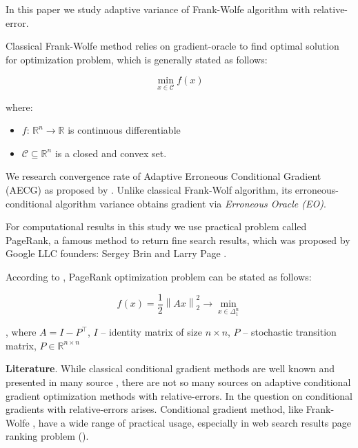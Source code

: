 \documentclass[runningheads, final]{llncs}
\newcommand{\norm}[1]{\left\lVert#1\right\rVert}
\begin{document}
In this paper we study adaptive variance of Frank-Wolfe
\cite{frankwolfe:1956} algorithm with relative-error.

Classical Frank-Wolfe method relies on gradient-oracle to find optimal solution
for optimization problem, which is generally stated as follows:

\begin{equation}\label{eq:optimization}
    \min_{x \in \mathcal{C}} f(x)
\end{equation}

where:

\begin{itemize}
    \item $f$: $\mathbb{R}^n \rightarrow \mathbb{R}$ is continuous
          differentiable
    \item $\mathcal{C} \subseteq \mathbb{R}^n$ is a closed and convex set.
\end{itemize}

We research convergence rate of Adaptive Erroneous Conditional Gradient (AECG)
as proposed by \cite{hallak:2024}.
Unlike classical Frank-Wolf algorithm, its erroneous-conditional algorithm
variance obtains gradient via \textit{Erroneous Oracle (EO)}.

For computational results in this study we use practical problem called
PageRank, a famous method to return fine search results, which was proposed by
Google LLC founders: Sergey Brin and Larry Page \cite{brin:2012}.

According to \cite{anikin:2022}, PageRank optimization problem can be stated
as follows:

\begin{equation}
    f(x) = \frac{1}{2}\norm{Ax}_2^2 \to \min_{x\in\Delta^n_{1}}
\end{equation}

, where $A = I - P^\intercal$, $I$ -- identity matrix of size $n\times n$,
$P$ -- stochastic transition matrix, $P \in \mathbb{R}^{n\times n}$

\textbf{Literature}. While classical conditional gradient methods are well known
and presented in many source \cite{dvurechensky:2015,dvurechensky:2017}, there
are not so many sources on adaptive conditional gradient optimization methods
with relative-errors. In \cite{hallak:2024} the question on conditional
gradients with relative-errors arises. Conditional gradient method,
like Frank-Wolfe \cite{frankwolfe:1956}, have a wide range of practical usage,
especially in web search results page ranking problem (\cite{anikin:2022}).
\end{document}
